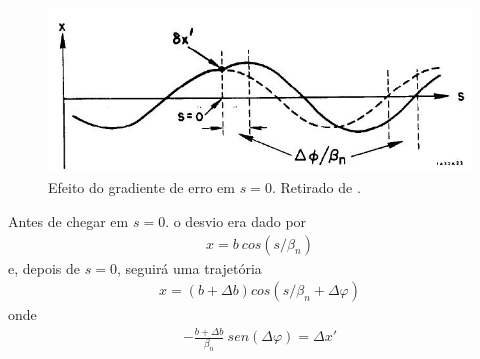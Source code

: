 \begin{figure}[!htb]
	\centering
	\includegraphics[width=0.7\linewidth]{./Figuras/fig23.jpeg}
	\caption{Efeito do gradiente de erro em $s=0$. Retirado de \cite{sands1970physics}.}
	\label{fig:fig23}
\end{figure}

Antes de chegar em $s=0$. o desvio era dado por
\begin{align}
	x = b\ cos(s/\beta_n)
\end{align}
e, depois de $s=0$, seguirá uma trajetória
\begin{align}
	x = (b+\Delta b)cos(s/\beta_n + \Delta \varphi)
\end{align}
onde
\begin{align}
	-\frac{b+\Delta b}{\beta_n}\ sen(\Delta \varphi) = \Delta x'
\end{align}

